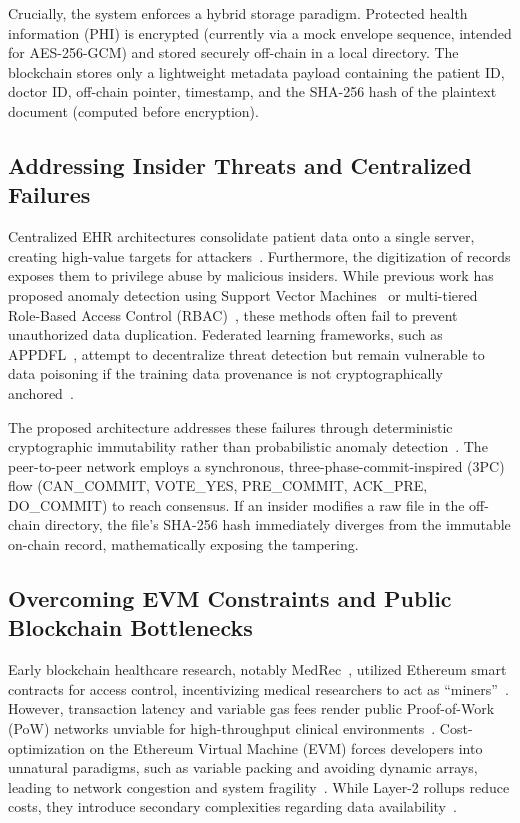 \documentclass[12pt]{article}
\begin{document}
Crucially, the system enforces a hybrid storage paradigm. Protected health information (PHI) is encrypted (currently via a mock envelope sequence, intended for AES-256-GCM) and stored securely off-chain in a local directory. The blockchain stores only a lightweight metadata payload containing the patient ID, doctor ID, off-chain pointer, timestamp, and the SHA-256 hash of the plaintext document (computed before encryption).

\subsection{Addressing Insider Threats and Centralized Failures}

Centralized EHR architectures consolidate patient data onto a single server, creating high-value targets for attackers~\cite{1}. Furthermore, the digitization of records exposes them to privilege abuse by malicious insiders. While previous work has proposed anomaly detection using Support Vector Machines~\cite{11} or multi-tiered Role-Based Access Control (RBAC)~\cite{1}, these methods often fail to prevent unauthorized data duplication. Federated learning frameworks, such as APPDFL~\cite{12}, attempt to decentralize threat detection but remain vulnerable to data poisoning if the training data provenance is not cryptographically anchored~\cite{14, 16}.

The proposed architecture addresses these failures through deterministic cryptographic immutability rather than probabilistic anomaly detection~\cite{3}. The peer-to-peer network employs a synchronous, three-phase-commit-inspired (3PC) flow (CAN\_COMMIT, VOTE\_YES, PRE\_COMMIT, ACK\_PRE, DO\_COMMIT) to reach consensus. If an insider modifies a raw file in the off-chain directory, the file's SHA-256 hash immediately diverges from the immutable on-chain record, mathematically exposing the tampering.

\subsection{Overcoming EVM Constraints and Public Blockchain Bottlenecks}

Early blockchain healthcare research, notably MedRec~\cite{18}, utilized Ethereum smart contracts for access control, incentivizing medical researchers to act as ``miners''~\cite{19}. However, transaction latency and variable gas fees render public Proof-of-Work (PoW) networks unviable for high-throughput clinical environments~\cite{9, 20}. Cost-optimization on the Ethereum Virtual Machine (EVM) forces developers into unnatural paradigms, such as variable packing and avoiding dynamic arrays, leading to network congestion and system fragility~\cite{5}. While Layer-2 rollups reduce costs, they introduce secondary complexities regarding data availability~\cite{8}.
\end{document}
